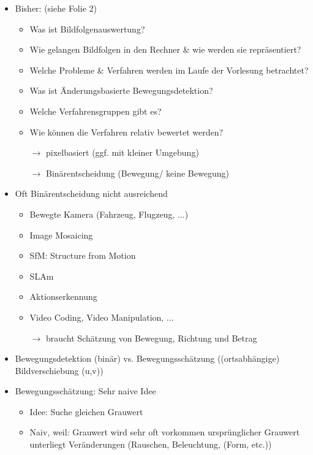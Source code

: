 \documentclass{report}
\begin{document}
	\begin{itemize}
		\item Bisher: (siehe Folie 2)
		\begin{itemize}
			\item Was ist Bildfolgenauswertung?
			\item Wie gelangen Bildfolgen in den Rechner \& wie werden sie repräsentiert?
			\item Welche Probleme \& Verfahren werden im Laufe der Vorlesung betrachtet?\newline

			\item Was ist Änderungsbasierte Bewegungsdetektion?
			\item Welche Verfahrensgruppen gibt es?
			\item Wie können die Verfahren relativ bewertet werden?\newline
			
			\item[$\rightarrow$] pixelbasiert (ggf. mit kleiner Umgebung)
			\item[$\rightarrow$] Binärentscheidung (Bewegung/ keine Bewegung)
		\end{itemize}
	
		\item Oft Binärentscheidung nicht ausreichend
		\begin{itemize}
			\item Bewegte Kamera (Fahrzeug, Flugzeug, ...)
			\item Image Mosaicing
			\item SfM: Structure from Motion
			\item SLAm
			\item Aktionserkennung
			\item Video Coding, Video Manipulation, ...
			\item[$\rightarrow$] braucht Schätzung von Bewegung, Richtung und Betrag
		\end{itemize}
	
		\item Bewegungsdetektion (binär) vs. Bewegungsschätzung ((ortsabhängige) Bildverschiebung (u,v))
		
		\item Bewegungsschätzung: Sehr naive Idee
		\begin{itemize}
			\item Idee: Suche gleichen Grauwert
			\item Naiv, weil:
			\newline Grauwert wird sehr oft vorkommen
			\newline ursprünglicher Grauwert unterliegt Veränderungen (Rauschen, Beleuchtung, (Form, etc.))
		\end{itemize}
	

\end{itemize}
\end{document}
